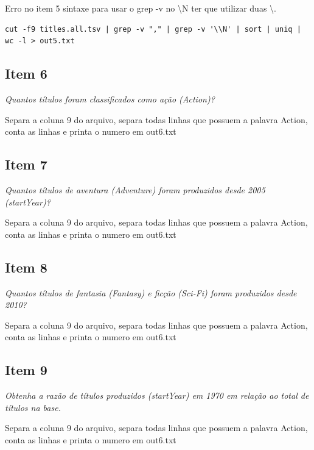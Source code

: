 \documentclass[12pt]{article}
\begin{document}
Erro no item 5 sintaxe para usar o grep -v no \textbackslash N ter que utilizar duas \textbackslash .

\begin{verbatim}
cut -f9 titles.all.tsv | grep -v "," | grep -v '\\N' | sort | uniq | wc -l > out5.txt
\end{verbatim}

\subsection*{Item 6}

\noindent\emph{Quantos títulos foram classificados como ação (Action)?}
\vspace{1em}

Separa a coluna 9 do arquivo, separa todas linhas que possuem a palavra Action, conta as linhas e printa o numero em out6.txt

\subsection*{Item 7}

\noindent\emph{Quantos títulos de aventura (Adventure) foram produzidos desde 2005 (startYear)?}
\vspace{1em}

Separa a coluna 9 do arquivo, separa todas linhas que possuem a palavra Action, conta as linhas e printa o numero em out6.txt

\subsection*{Item 8}

\noindent\emph{Quantos títulos de fantasia (Fantasy) e ficção (Sci-Fi) foram produzidos desde 2010?}
\vspace{1em}

Separa a coluna 9 do arquivo, separa todas linhas que possuem a palavra Action, conta as linhas e printa o numero em out6.txt

\subsection*{Item 9}

\noindent\emph{Obtenha a razão de títulos produzidos (startYear) em 1970 em relação ao total de títulos na base.}
\vspace{1em}

Separa a coluna 9 do arquivo, separa todas linhas que possuem a palavra Action, conta as linhas e printa o numero em out6.txt
\end{document}
